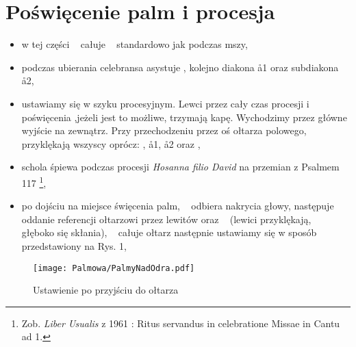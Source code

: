 \section{Poświęcenie palm i procesja}

\begin{itemize}
	\item w tej części \dd~ całuje \ii~ standardowo jak podczas mszy,
	\item podczas ubierania celebransa asystuje \cc, kolejno diakona \aa1 oraz
	      subdiakona \aa2,
	\item ustawiamy się w szyku procesyjnym. Lewci przez cały czas procesji i
	      poświęcenia ,jeżeli jest to możliwe, trzymają kapę. Wychodzimy przez
	      główne wyjście na zewnątrz. Przy przechodzeniu przez oś ołtarza
	      polowego, przyklękają wszyscy oprócz: , \aa1, \aa2 oraz \ii,
	\item schola śpiewa podczas procesji \textit{Hosanna filio David} na
	      przemian z Psalmem 117 \footnote{Zob. \textit{Liber Usualis} z 1961 :
		      Ritus servandus in celebratione Missae in Cantu ad 1.},
	\item po dojściu na miejsce święcenia palm, \cc~ odbiera nakrycia głowy,
	      następuje  oddanie referencji ołtarzowi przez lewitów oraz \ii~
	      (lewici przyklękają, \ii~ głęboko się skłania), \ii~ całuje ołtarz
	      następnie ustawiamy się w sposób przedstawiony na Rys. 1,
\end{itemize}

\bigskip

\begin{figure}[h]
	\centering
	\texttt{[image: Palmowa/PalmyNadOdra.pdf]}
	\caption{Ustawienie po przyjściu do ołtarza}
\end{figure}

\bigskip

